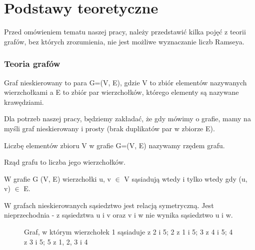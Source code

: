 \chapter{Podstawy teoretyczne} 
Przed omówieniem tematu naszej pracy, należy przedstawić kilka pojęć z teorii grafów, bez których zrozumienia, nie jest możliwe wyznaczanie liczb Ramseya.

  \subsection{Teoria grafów}
  \begin{definition}
    Graf nieskierowany to para G=(V, E), gdzie V to zbiór elementów nazywanych wierzchołkami a E to zbiór par wierzchołków, którego elementy są nazywane krawędziami.
  \end{definition}

  Dla potrzeb naszej pracy, będziemy zakładać, że gdy mówimy o grafie, mamy na myśli graf nieskierowany i prosty (brak duplikatów par w zbiorze E).
  
  \begin{definition}
    Liczbę elementów zbioru V w grafie G=(V, E) nazywamy rzędem grafu. 
  \end{definition}

  Rząd grafu to liczba jego wierzchołków. 

  \begin{definition}[Sąsiedztwo]
    W grafie G (V, E) wierzchołki u, v $\in$ V sąsiadują wtedy i tylko wtedy gdy (u, v) $\in$ E.    
  \end{definition}
  W grafach nieskierowanych sąsiedztwo jest relacją symetryczną. Jest nieprzechodnia - z sąsiedztwa u i v oraz v i w nie wynika sąsiedztwo u i w.

  \begin{figure}[h]
    \centering
    \caption{Graf, w którym wierzchołek 1 sąsiaduje z 2 i 5; 2 z 1 i 5; 3 z 4 i 5; 4 z 3 i 5; 5 z 1, 2, 3 i 4 }
  \end{figure}

